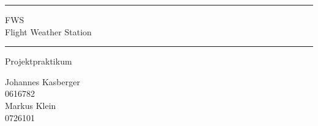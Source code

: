 \documentclass[a4paper,english,12pt,oneside]{memoir}
\newcommand\HRule{\noindent\rule{\linewidth}{1.5pt}}
\begin{document}
\begin{titlingpage}
    \HRule
    \begin{center}
        \LARGE FWS \\ 
        Flight Weather Station
    \end{center}
    \HRule
    \begin{center}
        \Large Projektpraktikum \\
        
     \end{center}
    \begin{center}
        \vspace{30pt}
        \normalsize Johannes Kasberger \\
        0616782 \\
        \vspace{15pt}
        Markus Klein \\
        0726101
     \end{center}
 \end{titlingpage}

\tableofcontents






\end{document}
